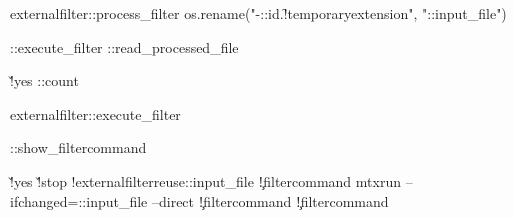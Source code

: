 \starttexdefinition externalfilter::process_filter
     \startmode[\s!mkiv]
         \startluacode
           os.rename("\jobname-\externalfilter::id.\f!temporaryextension", "\externalfilter::input_file")
         \stopluacode
     \stopmode
           

     \externalfilter::execute_filter
     \externalfilter::read_processed_file
     \endgroup 

     \v!yes
          {\doglobal\expandafter\increment\csname\externalfilter::count\endcsname}

     \dorechecknextindentation
\stoptexdefinition


\starttexdefinition externalfilter::execute_filter

   \externalfilter::show_filtercommand

   \v!yes
       {\v!stop
            {\showmessage\m!externalfilter{reuse}\externalfilter::input_file}
            {
               {
                   {
                    \executesystemcommand
                      {\externalfilterparameter\c!filtercommand}}
                   {\executesystemcommand
                    {mtxrun --ifchanged=\externalfilter::input_file\space 
                        --direct \externalfilterparameter\c!filtercommand}}}}}
       {\executesystemcommand
          {\externalfilterparameter\c!filtercommand}}
\stoptexdefinition


